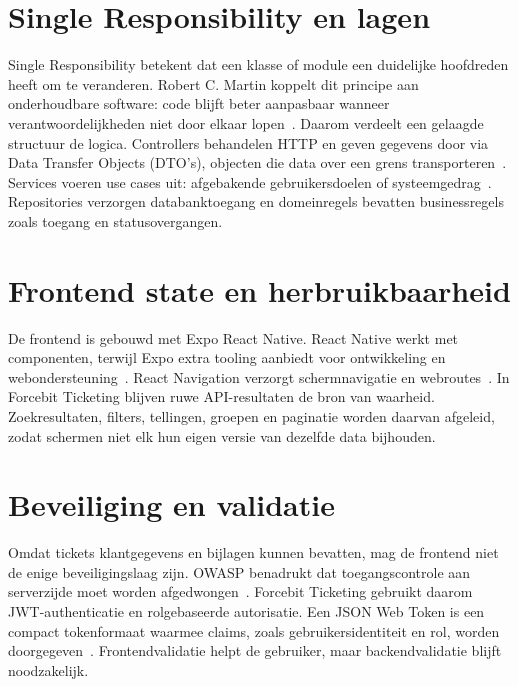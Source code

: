 \section{Single Responsibility en lagen}

Single Responsibility betekent dat een klasse of module een duidelijke hoofdreden heeft om te veranderen. Robert C. Martin koppelt dit principe aan onderhoudbare software: code blijft beter aanpasbaar wanneer verantwoordelijkheden niet door elkaar lopen~\autocite{Martin2017CleanArchitecture}. Daarom verdeelt een gelaagde structuur de logica. Controllers behandelen HTTP en geven gegevens door via Data Transfer Objects (DTO's), objecten die data over een grens transporteren~\autocite{Fowler2003DataTransferObject}. Services voeren use cases uit: afgebakende gebruikersdoelen of systeemgedrag~\autocite{Jacobson1992UseCaseDriven}. Repositories verzorgen databanktoegang en domeinregels bevatten businessregels zoals toegang en statusovergangen.

\section{Frontend state en herbruikbaarheid}

De frontend is gebouwd met Expo React Native. React Native werkt met componenten, terwijl Expo extra tooling aanbiedt voor ontwikkeling en webondersteuning~\autocite{ReactNative2026,ExpoDocs2026}. React Navigation verzorgt schermnavigatie en webroutes~\autocite{ReactNavigation2026}. In Forcebit Ticketing blijven ruwe API-resultaten de bron van waarheid. Zoekresultaten, filters, tellingen, groepen en paginatie worden daarvan afgeleid, zodat schermen niet elk hun eigen versie van dezelfde data bijhouden.

\section{Beveiliging en validatie}

Omdat tickets klantgegevens en bijlagen kunnen bevatten, mag de frontend niet de enige beveiligingslaag zijn. OWASP benadrukt dat toegangscontrole aan serverzijde moet worden afgedwongen~\autocite{OWASPAccessControl2026}. Forcebit Ticketing gebruikt daarom JWT-authenticatie en rolgebaseerde autorisatie. Een JSON Web Token is een compact tokenformaat waarmee claims, zoals gebruikersidentiteit en rol, worden doorgegeven~\autocite{JwtRFC7519}. Frontendvalidatie helpt de gebruiker, maar backendvalidatie blijft noodzakelijk.

